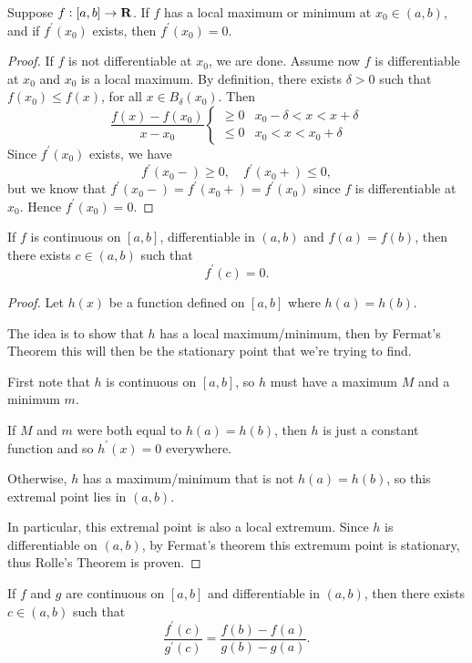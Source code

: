 \begin{lemma}
Suppose $f:[a,b]\to\mathbf R$. If $f$ has a local maximum or minimum at $x_0\in(a,b)$, and if $f^\prime(x_0)$ exists, then $f^\prime(x_0)=0$.
\end{lemma}

\begin{proof}
If $f$ is not differentiable at $x_0$, we are done. Assume now $f$ is differentiable at $x_0$ and $x_0$ is a local maximum. By definition, there exists $\delta>0$ such that $f(x_0)\le f(x)$, for all $x\in B_\delta(x_0)$. Then
\[ \frac{f(x)-f(x_0)}{x-x_0}\begin{cases}
\ge0 & x_0-\delta<x<x+\delta\\
\le0 & x_0<x<x_0+\delta
\end{cases} \]
Since $f^\prime(x_0)$ exists, we have
\[ f^\prime(x_0-)\ge0, \quad f^\prime(x_0+)\le0, \]
but we know that $f^\prime(x_0-)=f^\prime(x_0+)=f^\prime(x_0)$ since $f$ is differentiable at $x_0$. Hence $f^\prime(x_0)=0$.
\end{proof}

\begin{theorem}\label{thrm:rolle}
If $f$ is continuous on $[a,b]$, differentiable in $(a,b)$ and $f(a)=f(b)$, then there exists $c\in(a,b)$ such that 
\[ f^\prime(c)=0. \]
\end{theorem}

\begin{proof}
Let $h(x)$ be a function defined on $[a,b]$ where $h(a)=h(b)$.

The idea is to show that $h$ has a local maximum/minimum, then by Fermat's Theorem this will then be the stationary point that we're trying to find.

First note that $h$ is continuous on $[a,b]$, so $h$ must have a maximum $M$ and a minimum $m$.

If $M$ and $m$ were both equal to $h(a)=h(b)$, then $h$ is just a constant function and so $h^\prime(x)=0$ everywhere.

Otherwise, $h$ has a maximum/minimum that is not $h(a)=h(b)$, so this extremal point lies in $(a,b)$.

In particular, this extremal point is also a local extremum.
Since $h$ is differentiable on $(a,b)$, by Fermat's theorem this extremum point is stationary, thus Rolle's Theorem is proven.
\end{proof}

\begin{theorem}\label{thrm:generalised-mvt}
If $f$ and $g$ are continuous on $[a,b]$ and differentiable in $(a,b)$, then there exists $c\in(a,b)$ such that
\[ \frac{f^\prime(c)}{g^\prime(c)}=\frac{f(b)-f(a)}{g(b)-g(a)}. \]
\end{theorem}

